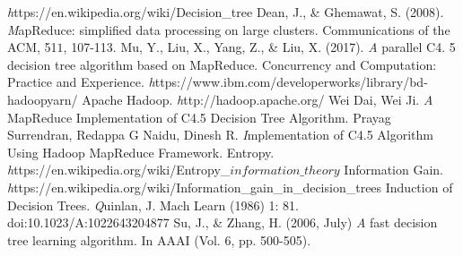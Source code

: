 \documentclass{article}
\begin{document}
\begin{thebibliography}{9}
\textit https://en.wikipedia.org/wiki/Decision\_tree
Dean, J., \& Ghemawat, S. (2008).
\textit MapReduce: simplified data processing on large clusters. Communications of the ACM, 51\(1\), 107-113.
Mu, Y., Liu, X., Yang, Z., \& Liu, X. (2017).
\textit A parallel C4. 5 decision tree algorithm based on MapReduce. Concurrency and Computation: Practice and Experience.
\textit https://www.ibm.com/developerworks/library/bd-hadoopyarn/
Apache Hadoop.
\textit http://hadoop.apache.org/
Wei Dai, Wei Ji.
\textit A MapReduce Implementation of C4.5 Decision Tree Algorithm.
Prayag Surrendran, Redappa G Naidu, Dinesh R.
\textit Implementation of C4.5 Algorithm Using Hadoop MapReduce Framework.
Entropy.
\textit https://en.wikipedia.org/wiki/Entropy\_\(information\_theory\)
Information Gain.
\textit https://en.wikipedia.org/wiki/Information\_gain\_in\_decision\_trees
Induction of Decision Trees.
\textit Quinlan, J. Mach Learn (1986) 1: 81. doi:10.1023/A:1022643204877
 Su, J., \& Zhang, H. (2006, July)
\textit A fast decision tree learning algorithm. In AAAI (Vol. 6, pp. 500-505).
\end{thebibliography}
\end{document}
